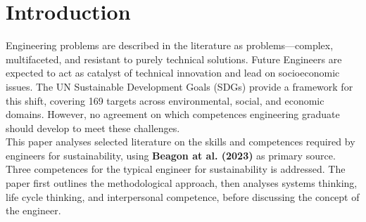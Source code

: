 \documentclass[11pt, a4paper]{article}
\begin{document}
\maketitle
{}
\setcounter{page}{1}

\begin{abstract}
  Today's engineering education is pressurised to respond to the Sustainable Development Goals (SDGs),
  yet the literature lacks consensus on which competences future engineers actually need. This short
  paper analyses\cite{beagon2023preparing} European focus-group study---covering 86 students,
  academics, and employers across Denmark, Finland, France, and Ireland---to examine three competences
  relevant to a sustainability engineer:\textbf{systems thinking}, \textbf{life cycle thinking}, and
  \textbf{interpersonal competence}. Upon analysis, the paper shows strong stakeholder agreement that
  systems thinking and interpersonal competence are essential, while life cycle thinking is recognised
  primarily by students  and remains implicit. The analysis questions the notion of a
  sustainability engineer, arguing that no single profile exists; instead, the typical engineer is a
  technically grounded professional who adds \textbf{holistic} and  \textbf{human-centred} competences
  to disciplinary depth. The analysis concludes that a gap is not in identifying competences but in
  integrating them into overcrowded curricula.
\end{abstract}

\tableofcontents
\newpage
{}
\setcounter{page}{1}

\section{Introduction}
Engineering problems are described in the literature as  problems---complex,
multifaceted, and resistant to purely technical solutions\cite{beagon2023preparing}. Future Engineers
are expected to act as catalyst of technical innovation and lead on socioeconomic issues. The UN
Sustainable Development Goals (SDGs) provide a framework for this shift, covering 169 targets across
environmental, social, and economic domains. However, no agreement on which competences engineering
graduate should develop to meet these challenges.\\

This paper analyses selected literature on the skills and competences required by engineers
for sustainability, using  \textbf{Beagon at al. (2023)} as primary source. Three competences for the
typical engineer for sustainability is addressed. The paper first outlines the methodological approach,
then analyses systems thinking, life cycle thinking, and interpersonal competence, before discussing
the concept of the  engineer.
\end{document}
